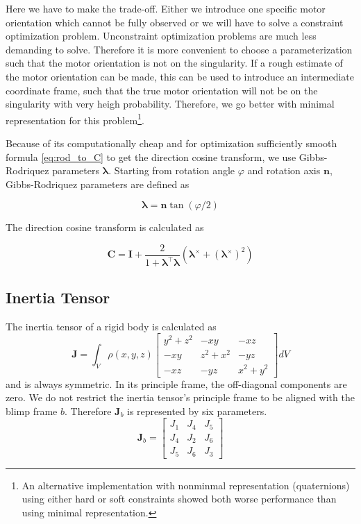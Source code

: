 Here we have to make the trade-off. Either we introduce one specific motor orientation which cannot be fully observed or we will have to solve a constraint optimization problem.
Unconstraint optimization problems are much less demanding to solve.
Therefore it is more convenient to choose a parameterization such that the motor orientation is not on the singularity.
If a rough estimate of the motor orientation can be made, this can be used to introduce an intermediate coordinate frame, such that the true motor orientation will not be on the singularity with very heigh probability.
Therefore, we go better with minimal representation for this problem\footnote{
An alternative implementation with nonminmal representation (quaternions) using either hard or soft constraints showed both worse performance than using minimal representation.
}.

Because of its computationally cheap and for optimization sufficiently smooth formula \eqref{eq:rod_to_C} to get the direction cosine transform, we use Gibbs-Rodriquez parameters $\boldsymbol{\lambda}$. Starting from rotation angle $\varphi$ and rotation axis $\mathbf{n}$, Gibbs-Rodriquez parameters are defined as

\begin{equation}
\boldsymbol{\lambda} = \mathbf{n} \tan(\varphi/2) 
\end{equation}

The direction cosine transform is calculated as

\begin{equation}
\label{eq:rod_to_C}
\mathbf{C} = \mathbf{I} + \frac{2}{1+\boldsymbol{\lambda}^\top \boldsymbol{\lambda}}
\left(\boldsymbol{\lambda}^\times + \left(\boldsymbol{\lambda}^\times\right)^2\right)
\end{equation}

\subsection{Inertia Tensor}
\label{sub:par_inertia}
The inertia tensor of a rigid body is calculated as
\begin{equation}
\mathbf{J} = \int_V \rho(x,y,z) 
\left[ \begin{array}{ccc}
y^2+z^2 & - xy    & - xz \\
- xy    & z^2+x^2 & - yz \\
- xz    & - yz    & x^2+y^2
\end{array} \right] dV
\end{equation}
and is always symmetric.
In its principle frame, the off-diagonal components are zero. We do not restrict the inertia tensor's principle frame to be aligned with the blimp frame $b$.
Therefore $\mathbf{J}_b$ is represented by six parameters.
\begin{equation}
\mathbf{J}_b = 
\left[ \begin{array}{ccc}
J_1 & J_4 & J_5 \\
J_4 & J_2 & J_6 \\
J_5 & J_6 & J_3
\end{array} \right]
\end{equation}



